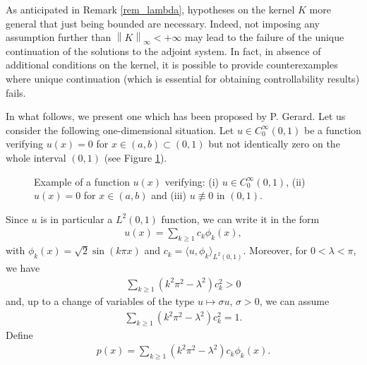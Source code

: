 \documentclass{amsart}    %
\newcommand{\norm}[2]{\left\|#1\right\|_{#2}}
\begin{document}
As anticipated in Remark \ref{rem_lambda}, hypotheses on the kernel $K$ more general that just being bounded are necessary. Indeed, not imposing any assumption further than $\norm{K}{\infty}<+\infty$ may lead to the failure of the unique continuation of the solutions to the adjoint system. In fact, in absence of additional conditions on the kernel, it is possible to provide counterexamples where unique continuation (which is essential for obtaining controllability results) fails.

In what follows, we present one which has been proposed by P. Gerard. Let us consider the following one-dimensional situation. Let $u\in C_0^\infty(0,1)$ be a function verifying $u(x)=0$ for $x\in(a,b)\subset(0,1)$ but not identically zero on the whole interval $(0,1)$ (see Figure \ref{figure_u}). 

\begin{figure}[h]
	\caption{Example of a function $u(x)$ verifying: (i) $u\in C_0^\infty(0,1)$, (ii) $u(x)=0$ for $x\in(a,b)$ and (iii) $u\not\equiv 0$ in $(0,1).$}\label{figure_u}
\end{figure}	

Since $u$ is in particular a $L^2(0,1)$ function, we can write it in the form
\begin{align*}
	u(x)=\sum_{k\geq 1} c_k\phi_k(x),
\end{align*}
with $\phi_k(x)=\sqrt{2}\sin(k\pi x)$ and $c_k=\langle u,\phi_k\rangle_{L^2(0,1)}$. Moreover, for $0<\lambda<\pi$, we have 
\begin{align*}
	\sum_{k\geq 1}\left(k^2\pi^2-\lambda^2\right)c_k^2 >0
\end{align*}
and, up to a change of variables of the type $u\mapsto\sigma u$, $\sigma>0$, we can assume 
\begin{align*}
	\sum_{k\geq 1}\left(k^2\pi^2-\lambda^2\right)c_k^2 =1.
\end{align*}	
Define
\begin{align*}
	p(x) = \sum_{k\geq 1} \left(k^2\pi^2-\lambda^2\right)c_k\phi_k(x).
\end{align*}
\end{document}
